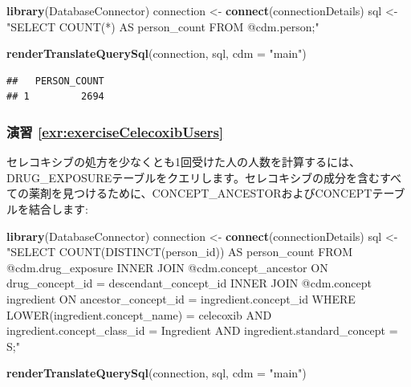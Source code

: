 \documentclass[
  11pt]{book}
\newenvironment{Shaded}{\begin{snugshade}}{\end{snugshade}}
\newcommand{\AttributeTok}[1]{\textcolor[rgb]{0.13,0.29,0.53}{#1}}
\newcommand{\FunctionTok}[1]{\textcolor[rgb]{0.13,0.29,0.53}{\textbf{#1}}}
\newcommand{\NormalTok}[1]{#1}
\newcommand{\OtherTok}[1]{\textcolor[rgb]{0.56,0.35,0.01}{#1}}
\newcommand{\StringTok}[1]{\textcolor[rgb]{0.31,0.60,0.02}{#1}}
\theoremstyle{definition}
\theoremstyle{definition}
\theoremstyle{definition}
\theoremstyle{definition}
\theoremstyle{remark}
\begin{document}
\begin{Shaded}
\begin{Highlighting}[]
\FunctionTok{library}\NormalTok{(DatabaseConnector)}
\NormalTok{connection }\OtherTok{\textless{}{-}} \FunctionTok{connect}\NormalTok{(connectionDetails)}
\NormalTok{sql }\OtherTok{\textless{}{-}} \StringTok{"SELECT COUNT(*) AS person\_count}
\StringTok{FROM @cdm.person;"}

\FunctionTok{renderTranslateQuerySql}\NormalTok{(connection, sql, }\AttributeTok{cdm =} \StringTok{"main"}\NormalTok{)}
\end{Highlighting}
\end{Shaded}

\begin{verbatim}
##   PERSON_COUNT
## 1         2694
\end{verbatim}

\subsubsection*{演習 \ref{exr:exerciseCelecoxibUsers}}\label{ux6f14ux7fd2-refexrexercisecelecoxibusers}

セレコキシブの処方を少なくとも1回受けた人の人数を計算するには、DRUG\_EXPOSUREテーブルをクエリします。セレコキシブの成分を含むすべての薬剤を見つけるために、CONCEPT\_ANCESTORおよびCONCEPTテーブルを結合します:

\begin{Shaded}
\begin{Highlighting}[]
\FunctionTok{library}\NormalTok{(DatabaseConnector)}
\NormalTok{connection }\OtherTok{\textless{}{-}} \FunctionTok{connect}\NormalTok{(connectionDetails)}
\NormalTok{sql }\OtherTok{\textless{}{-}} \StringTok{"SELECT COUNT(DISTINCT(person\_id)) AS person\_count}
\StringTok{FROM @cdm.drug\_exposure}
\StringTok{INNER JOIN @cdm.concept\_ancestor}
\StringTok{  ON drug\_concept\_id = descendant\_concept\_id}
\StringTok{INNER JOIN @cdm.concept ingredient}
\StringTok{  ON ancestor\_concept\_id = ingredient.concept\_id}
\StringTok{WHERE LOWER(ingredient.concept\_name) = \textquotesingle{}celecoxib\textquotesingle{}}
\StringTok{  AND ingredient.concept\_class\_id = \textquotesingle{}Ingredient\textquotesingle{}}
\StringTok{  AND ingredient.standard\_concept = \textquotesingle{}S\textquotesingle{};"}

\FunctionTok{renderTranslateQuerySql}\NormalTok{(connection, sql, }\AttributeTok{cdm =} \StringTok{"main"}\NormalTok{)}
\end{Highlighting}
\end{Shaded}
\end{document}

